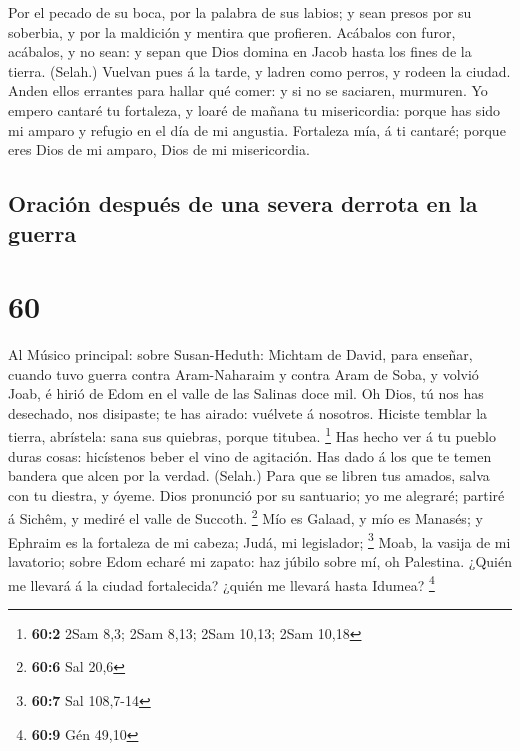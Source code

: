  Por el pecado de su boca, por la palabra de sus labios; y
sean presos por su soberbia, y por la maldición y mentira que profieren.
 Acábalos con furor, acábalos, y no sean: y sepan que Dios
domina en Jacob hasta los fines de la tierra. (Selah.) 
Vuelvan pues á la tarde, y ladren como perros, y rodeen la ciudad.
 Anden ellos errantes para hallar qué comer: y si no se
saciaren, murmuren.  Yo empero cantaré tu fortaleza, y
loaré de mañana tu misericordia: porque has sido mi amparo y refugio en
el día de mi angustia.  Fortaleza mía, á ti cantaré; porque
eres Dios de mi amparo, Dios de mi misericordia.

\hypertarget{oraciuxf3n-despuuxe9s-de-una-severa-derrota-en-la-guerra}{%
\subsection{Oración después de una severa derrota en la
guerra}\label{oraciuxf3n-despuuxe9s-de-una-severa-derrota-en-la-guerra}}

\hypertarget{section-59}{%
\section{60}\label{section-59}}

 Al Músico principal: sobre Susan-Heduth: Michtam de David,
para enseñar, cuando tuvo guerra contra Aram-Naharaim y contra Aram de
Soba, y volvió Joab, é hirió de Edom en el valle de las Salinas doce
mil. Oh Dios, tú nos has desechado, nos disipaste; te has airado:
vuélvete á nosotros.  Hiciste temblar la tierra, abrístela:
sana sus quiebras, porque titubea. \footnote{\textbf{60:2} 2Sam 8,3;
  2Sam 8,13; 2Sam 10,13; 2Sam 10,18}  Has hecho ver á tu
pueblo duras cosas: hicístenos beber el vino de agitación. 
Has dado á los que te temen bandera que alcen por la verdad. (Selah.)
 Para que se libren tus amados, salva con tu diestra, y
óyeme.  Dios pronunció por su santuario; yo me alegraré;
partiré á Sichêm, y mediré el valle de Succoth. \footnote{\textbf{60:6}
  Sal 20,6}  Mío es Galaad, y mío es Manasés; y Ephraim es
la fortaleza de mi cabeza; Judá, mi legislador; \footnote{\textbf{60:7}
  Sal 108,7-14}  Moab, la vasija de mi lavatorio; sobre Edom
echaré mi zapato: haz júbilo sobre mí, oh Palestina.  ¿Quién
me llevará á la ciudad fortalecida? ¿quién me llevará hasta Idumea?
\footnote{\textbf{60:9} Gén 49,10}

